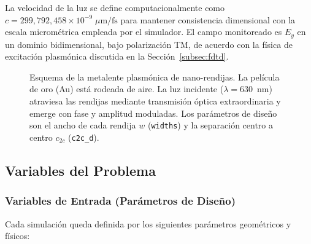 La velocidad de la luz se define computacionalmente como $c = 299{,}792{,}458 \times 10^{-9}\;\mu\text{m/fs}$ para mantener consistencia dimensional con la escala micrométrica empleada por el simulador. El campo monitoreado es $E_y$ en un dominio bidimensional, bajo polarización TM, de acuerdo con la física de excitación plasmónica discutida en la Sección~\ref{subsec:fdtd}.

\begin{figure}[H]
    \centering
    
    \caption{Esquema de la metalente plasmónica de nano-rendijas. La película de oro
    (Au) está rodeada de aire. La luz incidente
    ($\lambda = 630$~nm) atraviesa las rendijas mediante transmisión óptica extraordinaria
    y emerge con fase y amplitud moduladas. Los parámetros de diseño son el ancho de cada
    rendija $w$ (\texttt{widths}) y la separación centro a centro $c_{2c}$ (\texttt{c2c\_d}).}
    \label{fig:arreglo}
\end{figure}

\subsection{Variables del Problema}\label{subsec:variables}

\subsubsection{Variables de Entrada (Parámetros de Diseño)}

Cada simulación queda definida por los siguientes parámetros geométricos y físicos:

